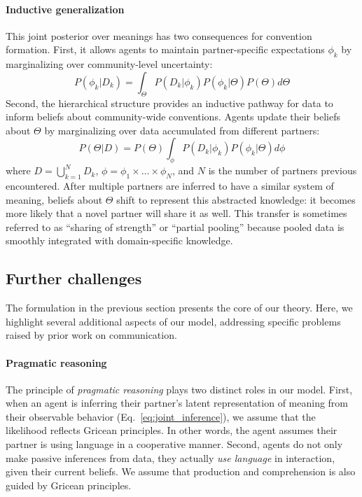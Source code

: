 \paragraph{Inductive generalization}

This joint posterior over meanings has two consequences for convention formation.
First, it allows agents to maintain partner-specific expectations $\phi_k$ by marginalizing over community-level uncertainty:
\begin{equation}
P(\phi_k | D_k) = \int_{\Theta}P(D_k | \phi_k) P(\phi_k | \Theta) P(\Theta)  d\Theta
\end{equation}
Second, the hierarchical structure provides an inductive pathway for data to inform beliefs about community-wide conventions.
Agents update their beliefs about $\Theta$ by marginalizing over data accumulated from different partners:
\begin{equation}
P(\Theta | D) = P(\Theta) \int_{\phi} P(D_k | \phi_k) P(\phi_k | \Theta) d\phi
\end{equation}
where $D = \bigcup_{k=1}^N D_k$, $\phi = \phi_1 \times \dots \times \phi_N$, and $N$ is the number of partners previous encountered. 
After multiple partners are inferred to have a similar system of meaning, beliefs about $\Theta$ shift to represent this abstracted knowledge: it becomes more likely that a novel partner will share it as well.
This transfer is sometimes referred to as ``sharing of strength'' or ``partial pooling'' because pooled data is smoothly integrated with domain-specific knowledge.

\subsection{Further challenges}

The formulation in the previous section presents the core of our theory.
Here, we highlight several additional aspects of our model, addressing specific problems raised by prior work on communication. 

\paragraph{Pragmatic reasoning}

The principle of \textit{pragmatic reasoning} plays two distinct roles in our model.
First, when an agent is inferring their partner's latent representation of meaning from their observable behavior (Eq.~\ref{eq:joint_inference}), we assume that the likelihood reflects Gricean principles.
In other words, the agent assumes their partner is using language in a cooperative manner.
Second, agents do not only make passive inferences from data, they actually \emph{use language} in interaction, given their current beliefs.
We assume that production and comprehension is also guided by Gricean principles.

